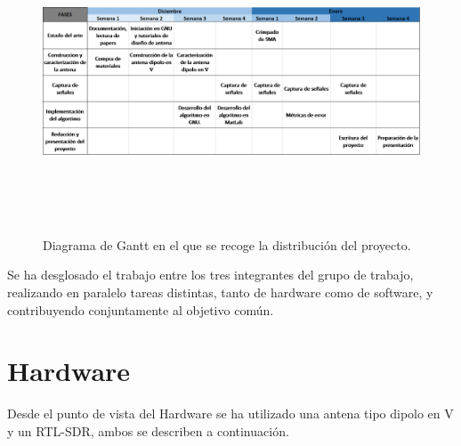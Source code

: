 \documentclass[a4paper,openright,12pt]{article}
\begin{document}
\begin{figure}[h!]
    \centering
    \includegraphics[width=1\linewidth, height=9cm]{imagenes/DiagramaGantt.png}
    \caption{Diagrama de Gantt en el que se recoge la distribución del proyecto.}
    \label{Fig:Gantt}
\end{figure}

Se ha desglosado el trabajo entre los tres integrantes del grupo de trabajo, realizando en paralelo tareas distintas, tanto de hardware como de software, y contribuyendo conjuntamente al objetivo común.

\newpage

\section{Hardware}
Desde el punto de vista del Hardware se ha utilizado una antena tipo dipolo en V y un RTL-SDR, ambos se describen a continuación.
\end{document}
